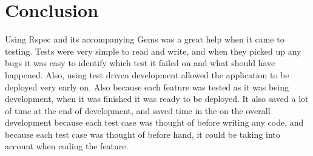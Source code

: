 \section{Conclusion}
Using Rspec and its accompanying Gems was a great help when it came to testing. Tests were very simple to read and write, and when they picked up any bugs it was easy to identify which test it failed on and what should have happened. Also, using test driven development allowed the application to be deployed very early on. Also because each feature was tested as it was being development, when it was finished it was ready to be deployed. It also saved a lot of time at the end of development, and saved time in the on the overall development because each test case was thought of before writing any code, and because each test case was thought of before hand, it could be taking into account when coding the feature. 